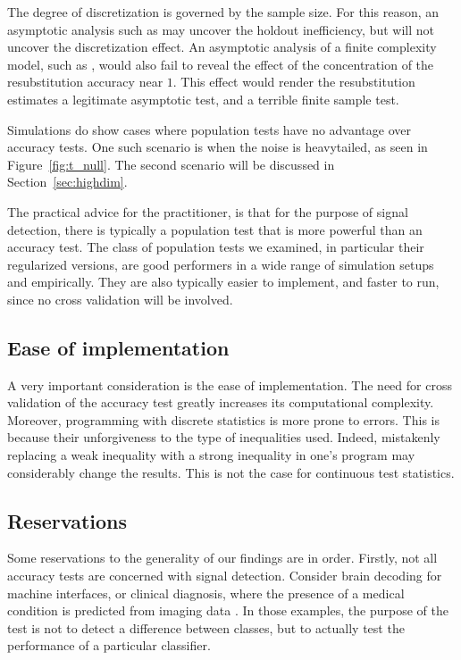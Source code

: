 \documentclass[12pt,a4paper]{article}
\theoremstyle{definition}
\begin{document}
The degree of discretization is governed by the sample size. 
For this reason, an asymptotic analysis such as \cite{ramdas_classification_2016} may uncover the holdout inefficiency, but will not uncover the discretization effect. 
An asymptotic analysis of a finite complexity model, such as \cite[Sec~4.3]{golland_permutation_2005}, would also fail to reveal the effect of the concentration of the resubstitution accuracy near $1$. This effect would render the resubstitution estimates a legitimate asymptotic test, and a terrible finite sample test. 

Simulations do show cases where population tests have no advantage over accuracy tests. 
One such scenario is when the noise is heavytailed, as seen in Figure~\ref{fig:t_null}.
The second scenario will be discussed in Section~\ref{sec:highdim}.

The practical advice for the practitioner, is that for the purpose of signal detection, there is typically a population test that is more powerful than an accuracy test. 
The class of population tests we examined, in particular their regularized versions, are good performers in a wide range of simulation setups and empirically. 
They are also typically easier to implement, and faster to run, since no cross validation will be involved. 



\subsection{Ease of implementation}
A very important consideration is the ease of implementation. 
The need for cross validation of the accuracy test greatly increases its computational complexity. 
Moreover, programming with discrete statistics is more prone to errors. 
This is because their unforgiveness to the type of inequalities used. 
Indeed, mistakenly replacing a weak inequality with a strong inequality in one's program may considerably change the results. 
This is not the case for continuous test statistics. 




\subsection{Reservations}
\label{sec:reservations}

Some reservations to the generality of our findings are in order. 
Firstly, not all accuracy tests are concerned with signal detection.
Consider brain decoding for machine interfaces, or clinical diagnosis, where the presence of a medical condition is predicted from imaging data \citep[e.g.][]{olivetti_induction_2012,wager_fmri-based_2013}. 
In those examples, the purpose of the test is not to detect a difference between classes, but to actually test the performance of a particular classifier.  
\end{document}
